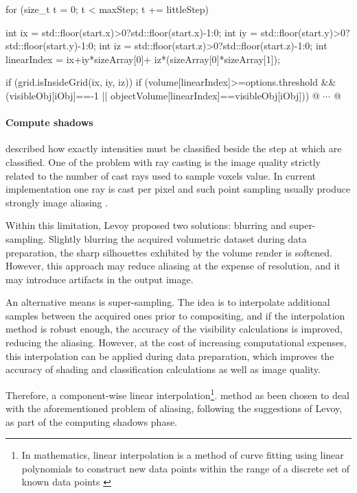 \documentclass[12pt,a4paper]{extarticle}
\newcommand{\linespace}{\vspace{8pt}}
\begin{document}
\begin{cpp}[caption={Intensities classification loop with threshold test and object-wise classification.},label=code:classification]
for (size_t t = 0; t < maxStep; t += littleStep) {
	int ix = std::floor(start.x)>0?std::floor(start.x)-1:0;
	int iy = std::floor(start.y)>0?std::floor(start.y)-1:0;
	int iz = std::floor(start.z)>0?std::floor(start.z)-1:0;
	int linearIndex = ix+iy*sizeArray[0]+
			iz*(sizeArray[0]*sizeArray[1]);
		
	if (grid.isInsideGrid(ix, iy, iz)) {
		if (volume[linearIndex]>=options.threshold && 
			(visibleObj[iObj]==-1 || 
			 objectVolume[linearIndex]==visibleObj[iObj])) {
		@ $\cdots$ @
		}
	}
}
\end{cpp}

\paragraph{Compute shadows}
\cite{levoy_1988:4} described how exactly intensities must be classified beside the step at which are classified.
One of the problem with ray casting is the image quality strictly related to the number of cast rays used to sample voxels value. In current implementation one ray is cast per pixel and such point sampling usually produce strongly image aliasing \cite{levoy_1988:4}.

Within this limitation, Levoy proposed two solutions: blurring and super-sampling. Slightly blurring the acquired volumetric dataset during data preparation, the sharp silhouettes exhibited by the volume render is softened. However, this approach may reduce aliasing at the expense of resolution, and it may introduce artifacts in the output image.


An alternative means is super-sampling. The idea is to interpolate additional samples between the acquired ones prior to compositing, and if the interpolation method is robust enough, the accuracy of the visibility calculations is improved, reducing the aliasing. However, at the cost of increasing computational expenses, this interpolation can be applied during data preparation, which improves the accuracy of shading and classification calculations as well as image quality.


Therefore, a component-wise linear interpolation\footnote{In mathematics, linear interpolation is a method of curve fitting using linear polynomials to construct new data points within the range of a discrete set of known data points \cite{993400}}. method as been chosen to deal with the aforementioned problem of aliasing, following the suggestions of Levoy, as part of the computing shadows phase.
\linespace
\end{document}

